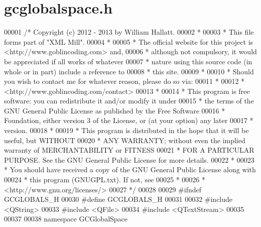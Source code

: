 \hypertarget{gcglobalspace_8h_source}{\section{gcglobalspace.\-h}
}

\begin{DoxyCode}
00001 \textcolor{comment}{/* Copyright (c) 2012 - 2013 by William Hallatt.}
00002 \textcolor{comment}{ *}
00003 \textcolor{comment}{ * This file forms part of "XML Mill".}
00004 \textcolor{comment}{ *}
00005 \textcolor{comment}{ * The official website for this project is <http://www.goblincoding.com> and,}
00006 \textcolor{comment}{ * although not compulsory, it would be appreciated if all works of whatever}
00007 \textcolor{comment}{ * nature using this source code (in whole or in part) include a reference to}
00008 \textcolor{comment}{ * this site.}
00009 \textcolor{comment}{ *}
00010 \textcolor{comment}{ * Should you wish to contact me for whatever reason, please do so via:}
00011 \textcolor{comment}{ *}
00012 \textcolor{comment}{ *                 <http://www.goblincoding.com/contact>}
00013 \textcolor{comment}{ *}
00014 \textcolor{comment}{ * This program is free software: you can redistribute it and/or modify it
       under}
00015 \textcolor{comment}{ * the terms of the GNU General Public License as published by the Free
       Software}
00016 \textcolor{comment}{ * Foundation, either version 3 of the License, or (at your option) any later}
00017 \textcolor{comment}{ * version.}
00018 \textcolor{comment}{ *}
00019 \textcolor{comment}{ * This program is distributed in the hope that it will be useful, but WITHOUT}
00020 \textcolor{comment}{ * ANY WARRANTY; without even the implied warranty of MERCHANTABILITY or
       FITNESS}
00021 \textcolor{comment}{ * FOR A PARTICULAR PURPOSE.  See the GNU General Public License for more
       details.}
00022 \textcolor{comment}{ *}
00023 \textcolor{comment}{ * You should have received a copy of the GNU General Public License along with}
00024 \textcolor{comment}{ * this program (GNUGPL.txt).  If not, see}
00025 \textcolor{comment}{ *}
00026 \textcolor{comment}{ *                    <http://www.gnu.org/licenses/>}
00027 \textcolor{comment}{ */}
00028 
00029 \textcolor{preprocessor}{#ifndef GCGLOBALS\_H}
00030 \textcolor{preprocessor}{}\textcolor{preprocessor}{#define GCGLOBALS\_H}
00031 \textcolor{preprocessor}{}
00032 \textcolor{preprocessor}{#include <QString>}
00033 \textcolor{preprocessor}{#include <QFile>}
00034 \textcolor{preprocessor}{#include <QTextStream>}
00035 
00037 
00038 \textcolor{keyword}{namespace }GCGlobalSpace

\end{DoxyCode}
